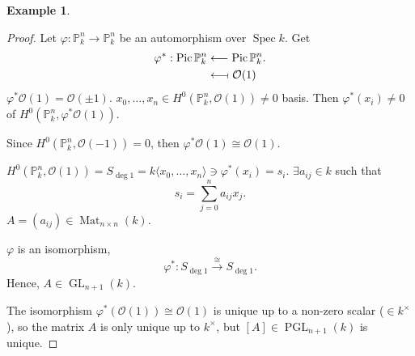 \documentclass[12pt]{article}
\DeclareMathOperator{\Spec}{Spec}
\DeclareMathOperator{\GL}{GL}
\DeclareMathOperator{\PGL}{PGL}
\DeclareMathOperator{\Pic}{Pic}
\DeclareMathOperator{\Mat}{Mat}
\theoremstyle{definition}
\newtheorem*{example}{Example}
\begin{document}
\begin{example}
\begin{proof}
Let $\varphi:\mathbb{P}_k^n\rightarrow\mathbb{P}_k^n$ be an automorphism over $\Spec k$. Get
\begin{align*}
\varphi^*:\Pic\mathbb{P}_k^n&\longleftarrow\Pic\mathbb{P}_k^n.\\
&\longleftarrow\!\shortmid\mathcal{O}(1)
\end{align*}
$\varphi^*\mathcal{O}(1)=\mathcal{O}(\pm1)$. $x_0,\ldots,x_n\in H^0(\mathbb{P}_k^n,\mathcal{O}(1))\neq0$ basis. Then $\varphi^*(x_i)\neq0$ of $H^0(\mathbb{P}_k^n,\varphi^*\mathcal{O}(1))$.

Since $H^0(\mathbb{P}_k^n,\mathcal{O}(-1))=0$, then $\varphi^*\mathcal{O}(1)\cong\mathcal{O}(1)$.

$H^0(\mathbb{P}_k^n,\mathcal{O}(1))=S_{\deg1}=k\langle x_0,\ldots,x_n\rangle\ni\varphi^*(x_i)=s_i$. $\exists a_{ij}\in k$ such that
\[s_i=\sum_{j=0}^na_{ij}x_j.\]
$A=(a_{ij})\in\Mat_{n\times n}(k)$.

$\varphi$ is an isomorphism,
\[\varphi^*:S_{\deg1}\overset{\cong}{\longrightarrow}S_{\deg1}.\]
Hence, $A\in\GL_{n+1}(k)$.

The isomorphism $\varphi^*(\mathcal{O}(1))\cong\mathcal{O}(1)$ is unique up to a non-zero scalar ($\in k^{\times}$), so the matrix $A$ is only unique up to $k^{\times}$, but $[A]\in\PGL_{n+1}(k)$ is unique.
\end{proof}
\end{example}
\end{document}

